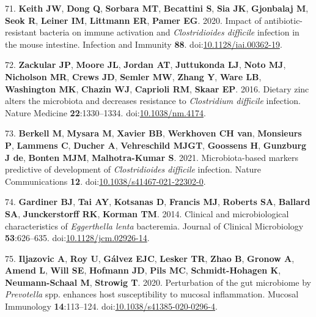 \documentclass[
  12pt,
]{article}
\newenvironment{cslreferences}%
  {}%
  {\par}
\begin{document}
\begin{cslreferences}
\leavevmode\hypertarget{ref-Keith2020}{}%
71. \textbf{Keith JW}, \textbf{Dong Q}, \textbf{Sorbara MT},
\textbf{Becattini S}, \textbf{Sia JK}, \textbf{Gjonbalaj M},
\textbf{Seok R}, \textbf{Leiner IM}, \textbf{Littmann ER}, \textbf{Pamer
EG}. 2020. Impact of antibiotic-resistant bacteria on immune activation
and \emph{Clostridioides difficile} infection in the mouse intestine.
Infection and Immunity \textbf{88}.
doi:\href{https://doi.org/10.1128/iai.00362-19}{10.1128/iai.00362-19}.

\leavevmode\hypertarget{ref-Zackular2016}{}%
72. \textbf{Zackular JP}, \textbf{Moore JL}, \textbf{Jordan AT},
\textbf{Juttukonda LJ}, \textbf{Noto MJ}, \textbf{Nicholson MR},
\textbf{Crews JD}, \textbf{Semler MW}, \textbf{Zhang Y}, \textbf{Ware
LB}, \textbf{Washington MK}, \textbf{Chazin WJ}, \textbf{Caprioli RM},
\textbf{Skaar EP}. 2016. Dietary zinc alters the microbiota and
decreases resistance to \emph{Clostridium difficile} infection. Nature
Medicine \textbf{22}:1330--1334.
doi:\href{https://doi.org/10.1038/nm.4174}{10.1038/nm.4174}.

\leavevmode\hypertarget{ref-Berkell2021}{}%
73. \textbf{Berkell M}, \textbf{Mysara M}, \textbf{Xavier BB},
\textbf{Werkhoven CH van}, \textbf{Monsieurs P}, \textbf{Lammens C},
\textbf{Ducher A}, \textbf{Vehreschild MJGT}, \textbf{Goossens H},
\textbf{Gunzburg J de}, \textbf{Bonten MJM}, \textbf{Malhotra-Kumar S}.
2021. Microbiota-based markers predictive of development of
\emph{Clostridioides difficile} infection. Nature Communications
\textbf{12}.
doi:\href{https://doi.org/10.1038/s41467-021-22302-0}{10.1038/s41467-021-22302-0}.

\leavevmode\hypertarget{ref-Gardiner2014}{}%
74. \textbf{Gardiner BJ}, \textbf{Tai AY}, \textbf{Kotsanas D},
\textbf{Francis MJ}, \textbf{Roberts SA}, \textbf{Ballard SA},
\textbf{Junckerstorff RK}, \textbf{Korman TM}. 2014. Clinical and
microbiological characteristics of \emph{Eggerthella lenta} bacteremia.
Journal of Clinical Microbiology \textbf{53}:626--635.
doi:\href{https://doi.org/10.1128/jcm.02926-14}{10.1128/jcm.02926-14}.

\leavevmode\hypertarget{ref-Iljazovic2020}{}%
75. \textbf{Iljazovic A}, \textbf{Roy U}, \textbf{Gálvez EJC},
\textbf{Lesker TR}, \textbf{Zhao B}, \textbf{Gronow A}, \textbf{Amend
L}, \textbf{Will SE}, \textbf{Hofmann JD}, \textbf{Pils MC},
\textbf{Schmidt-Hohagen K}, \textbf{Neumann-Schaal M}, \textbf{Strowig
T}. 2020. Perturbation of the gut microbiome by \emph{Prevotella} spp.
enhances host susceptibility to mucosal inflammation. Mucosal Immunology
\textbf{14}:113--124.
doi:\href{https://doi.org/10.1038/s41385-020-0296-4}{10.1038/s41385-020-0296-4}.


\end{cslreferences}
\end{document}

